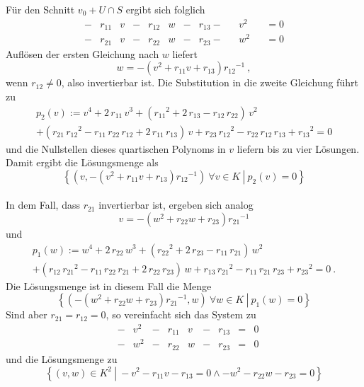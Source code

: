 \documentclass[a4paper,oneside, 11pt, openany%
]{article}
\newcommand{\coloneqq}{:=}
\theoremstyle{custom}
\theoremstyle{custom}
\begin{document}
Für den Schnitt $v_0 + U \cap S $ ergibt sich folglich
\begin{equation*}
	\begin{alignedat}{11}
		-&r_{11}&v&-&r_{12}&w&-&r_{13}-&&v^2&&=0\\
		-&r_{21}&v&-&r_{22}&w&-&r_{23}-&&w^2&&=0
	\end{alignedat}
\end{equation*}
Auflösen der ersten Gleichung nach $w$ liefert
\begin{equation*}
	w = -\left( v^2+r_{11}v+r_{13}\right) {r_{12}}^{-1} \ ,
\end{equation*}
wenn $r_{12} \neq 0$, also invertierbar ist.
Die Substitution in die zweite Gleichung führt zu
\begin{multline}
	p_{2}(v)\coloneqq v^4+2\,r_{11}\,v^3+\left({r_{11}}^2+2\,r_{13}-r_{12}\,r_{22}\right)\,v^2\\+\left(r_{21}\,{r_{12}}^2-r_{11}\,r_{22}\,r_{12}+2\,r_{11}\,r_{13}\right)\,v+r_{23}\,{r_{12}}^2-r_{22}\,r_{12}\,r_{13}+{r_{13}}^2=0
\end{multline}
und die Nullstellen dieses quartischen Polynoms in $v$ liefern bis zu vier Lösungen.
Damit ergibt die Lösungsmenge als
\begin{equation*}
	\left\{\left(v,-\left( v^2+r_{11}v+r_{13}\right) {r_{12}}^{-1}\right) \ \forall v \in K \ \left| \ p_{2}(v) = 0 \right.	\right\}
\end{equation*}\\
In dem Fall, dass $r_{21}$ invertierbar ist, ergeben sich analog
\begin{equation*}
	v = -\left(w^2+r_{22}w+r_{23} \right){r_{21}}^{-1} 
\end{equation*}
und
\begin{multline}
	p_{1}(w)\coloneqq w^4+2\,r_{22}\,w^3+\left({r_{22}}^2+2\,r_{23}-r_{11}\,r_{21}\right)\,w^2\\+\left(r_{12}\,{r_{21}}^2-r_{11}\,r_{22}\,r_{21}+2\,r_{22}\,r_{23}\right)\,w+r_{13}\,{r_{21}}^2-r_{11}\,r_{21}\,r_{23}+{r_{23}}^2=0
	\ .
\end{multline}
Die Lösungsmenge ist in diesem Fall die Menge
\begin{equation*}
	\left\{\left(-\left(w^2+r_{22}w+r_{23} \right){r_{21}}^{-1} ,w\right) \ \forall w \in K \ \left| \ p_{1}(w) = 0 \right.	\right\}
\end{equation*}
Sind aber $r_{21} = r_{12} = 0$, so vereinfacht sich das System zu
\begin{equation*}
	\begin{alignedat}{9}
		&-&v^2&-&r_{11}&v&-&r_{13}&=&0\\
		&-&w^2&-&r_{22}&w&-&r_{23}&=&0
	\end{alignedat}
\end{equation*}
und die Lösungsmenge zu
\begin{equation*}
	\left\{(v,w) \in K^2 \ \left| \ -v^2-r_{11}v-r_{13}=0 \wedge-w^2-r_{22}w-r_{23}=0\right. \right\}
\end{equation*}
\end{document}
